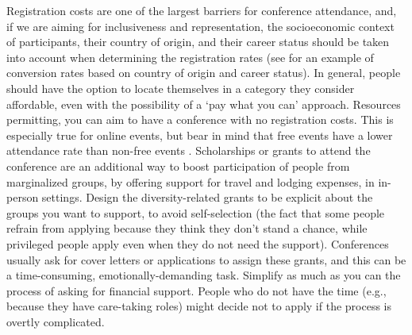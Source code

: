 \documentclass[10pt,letterpaper]{article}
\begin{document}
Registration costs are one of the largest barriers for conference attendance, and, if we are aiming for inclusiveness and representation, the socioeconomic context of participants, their country of origin, and their career status should be taken into account when determining the registration rates \cite{sarabipourChangingScientificMeetings2021, andalibPostdocQueueLabour2018, kaplanPostdocNot2012}
(see \cite{canelon2021cost} for an example of conversion rates based on country of origin and career status). 
In general, people should have the option to locate themselves in a category they consider affordable, even with the possibility of a `pay what you can' approach. 
Resources permitting, you can aim to have a conference with no registration costs. This is especially true for online events, but bear in mind that free events have a lower attendance rate than non-free events \cite{eventbrite_ultimate_2017}. 
Scholarships or grants to attend the conference are an additional way to boost participation of people from marginalized groups, by offering support for travel and lodging expenses, in in-person settings.
Design the diversity-related grants to be explicit about the groups you want to support, to avoid self-selection (the fact that some people refrain from applying because they think they don't stand a chance, while privileged people apply even when they do not need the support). 
Conferences usually ask for cover letters or applications to assign these grants, and this can be a time-consuming, emotionally-demanding task. Simplify as much as you can the process of asking for financial support. People who do not have the time (e.g., because they have care-taking roles) might decide not to apply if the process is overtly complicated. 
\end{document}
